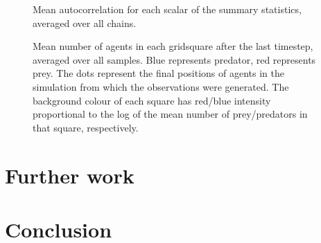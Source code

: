 \documentclass{article}
\begin{document}
\begin{figure}
	\centering
	\caption{Mean autocorrelation for each scalar of the summary statistics, averaged over all chains.}
	\label{figAutocorrelation}
\end{figure}

\begin{figure}
	\centering
	\caption{Mean number of agents in each gridsquare after the last timestep, averaged over all samples. Blue represents predator, red represents prey. The dots represent the final positions of agents in the simulation from which the observations were generated. The background colour of each square has red/blue intensity proportional to the log of the mean number of prey/predators in that square, respectively.}
	\label{figEndState}
\end{figure}


\section{Further work}

\section{Conclusion}


%
% 


\end{document}
